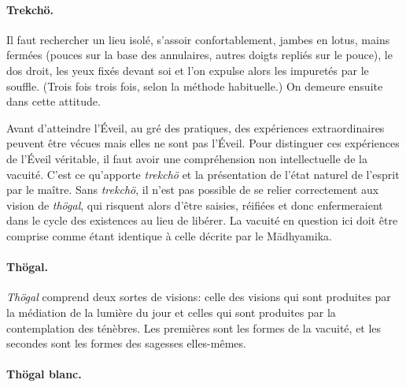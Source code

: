 \documentclass[11pt,a4paper]{article}
\begin{document}
\paragraph{Trekchö.}

Il faut rechercher un lieu isolé, s'assoir confortablement, jambes en
lotus, mains fermées (pouces sur la base des annulaires, autres doigts
repliés sur le pouce), le dos droit, les yeux fixés devant soi et l'on
expulse alors les impuretés par le souffle. (Trois fois trois fois,
selon la méthode habituelle.)  On demeure ensuite dans cette attitude.

Avant d'atteindre l'Éveil, au gré des pratiques, des expériences
extraordinaires peuvent être vécues mais elles ne sont pas
l'Éveil. Pour distinguer ces expériences de l'Éveil véritable, il faut
avoir une compréhension non intellectuelle de la vacuité. C'est ce
qu'apporte \emph{trekchö} et la présentation de l'état naturel de
l'esprit par le maître. Sans \emph{trekchö}, il n'est pas possible de
se relier correctement aux vision de \emph{thögal}, qui risquent alors
d'être saisies, réifiées et donc enfermeraient dans le cycle des
existences au lieu de libérer. La vacuité en question ici doit être
comprise comme étant identique à celle décrite par le M\=adhyamika.

\paragraph{Thögal.}

\emph{Thögal} comprend deux sortes de visions: celle des visions qui
sont produites par la médiation de la lumière du jour et celles qui
sont produites par la contemplation des ténèbres. Les premières sont
les formes de la vacuité, et les secondes sont les formes des sagesses
elles\hyp{}mêmes.

\paragraph{Thögal blanc.}
\end{document}
